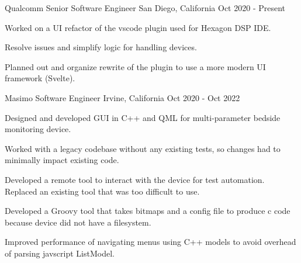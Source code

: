

\begin{cventries}


\cventry
{Qualcomm} %
{Senior Software Engineer} %
{San Diego, California} %
{Oct 2020 - Present} %
{
  \begin{cvitems} %
      \item{Worked on a UI refactor of the vscode plugin used for Hexagon DSP IDE.}
      \item{Resolve issues and simplify logic for handling devices.}
      \item{Planned out and organize rewrite of the plugin to use a more modern UI framework (Svelte).}
  \end{cvitems}
}

\cventry
{Masimo} %
{Software Engineer} %
{Irvine, California} %
{Oct 2020 - Oct 2022} %
{
  \begin{cvitems} %
      \item{Designed and developed GUI in C++ and QML for multi-parameter bedside monitoring device.}
      \item{Worked with a legacy codebase without any existing tests, so changes had to minimally impact existing code.}
      \item{Developed a remote tool to interact with the device for test automation. Replaced an existing tool that was too difficult to use. }
      \item{Developed a Groovy tool that takes bitmaps and a config file to produce c code because device did not have a filesystem.}
      \item{Improved performance of navigating menus using C++ models to avoid overhead of parsing javscript ListModel.}
  \end{cvitems}
}


\end{cventries}
